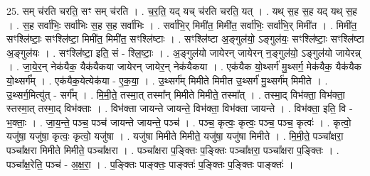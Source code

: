 \documentclass[17pt]{extarticle}
\begin{document}
25. सम् च॑रति चरति॒ सꣳ सम् च॑रति । . च॒र॒ति॒ यद् यच् च॑रति चरति॒ यत् । . यथ् स॒ह स॒ह यद् यथ् स॒ह । . स॒ह सर्वा॑भिः॒ सर्वा॑भिः स॒ह स॒ह सर्वा॑भिः । . सर्वा॑भि॒र् मिमी॑त॒ मिमी॑त॒ सर्वा॑भिः॒ सर्वा॑भि॒र् मिमी॑त । . मिमी॑त॒ सꣳश्लि॑ष्टाः॒ सꣳश्लि॑ष्टा॒ मिमी॑त॒ मिमी॑त॒ सꣳश्लि॑ष्टाः । . सꣳश्लि॑ष्टा अ॒ङ्गुल॑यो॒ ऽङ्गुल॑यः॒ सꣳश्लि॑ष्टाः॒ सꣳश्लि॑ष्टा अ॒ङ्गुल॑यः । . सꣳश्लि॑ष्टा॒ इति॒ सं - श्लि॒ष्टाः॒ । . अ॒ङ्गुल॑यो जायेरन् जायेरन् न॒ङ्गुल॑यो॒ ऽङ्गुल॑यो जायेरन्न् । . जा॒ये॒र॒न् नेक॑यैक॒ यैक॑यैकया जायेरन् जायेर॒न् नेक॑यैकया । . एक॑यैक यो॒थ्सर्ग॑ मु॒थ्सर्ग॒ मेक॑यैक॒ यैक॑यैक यो॒थ्सर्ग᳚म् । . एक॑यैक॒येत्येक॑या - ए॒क॒या॒ । . उ॒थ्सर्ग॑म् मिमीते मिमीत उ॒थ्सर्ग॑ मु॒थ्सर्ग॑म् मिमीते । . उ॒थ्सर्ग॒मित्यु॑त् - सर्ग᳚म् । . मि॒मी॒ते॒ तस्मा॒त् तस्मा᳚न् मिमीते मिमीते॒ तस्मा᳚त् । . तस्मा॒द् विभ॑क्ता॒ विभ॑क्ता॒ स्तस्मा॒त् तस्मा॒द् विभ॑क्ताः । . विभ॑क्ता जायन्ते जायन्ते॒ विभ॑क्ता॒ विभ॑क्ता जायन्ते । . विभ॑क्ता॒ इति॒ वि - भ॒क्ताः॒ । . जा॒य॒न्ते॒ पञ्च॒ पञ्च॑ जायन्ते जायन्ते॒ पञ्च॑ । . पञ्च॒ कृत्वः॒ कृत्वः॒ पञ्च॒ पञ्च॒ कृत्वः॑ । . कृत्वो॒ यजु॑षा॒ यजु॑षा॒ कृत्वः॒ कृत्वो॒ यजु॑षा । . यजु॑षा मिमीते मिमीते॒ यजु॑षा॒ यजु॑षा मिमीते । . मि॒मी॒ते॒ पञ्चा᳚क्षरा॒ पञ्चा᳚क्षरा मिमीते मिमीते॒ पञ्चा᳚क्षरा । . पञ्चा᳚क्षरा प॒ङ्क्तिः प॒ङ्क्तिः पञ्चा᳚क्षरा॒ पञ्चा᳚क्षरा प॒ङ्क्तिः । . पञ्चा᳚क्ष॒रेति॒ पञ्च॑ - अ॒क्ष॒रा॒ । . प॒ङ्क्तिः पाङ्क्तः॒ पाङ्क्तः॑ प॒ङ्क्तिः प॒ङ्क्तिः पाङ्क्तः॑ । \newline
\end{document}
